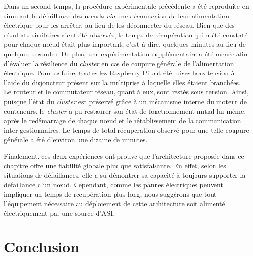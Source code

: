 Dans un second temps, la procédure expérimentale précédente a été reproduite en simulant la défaillance des n\oe{}uds \textit{via} une déconnexion de leur alimentation électrique pour les arrêter, au lieu de les déconnecter du réseau. Bien que des résultats similaires aient été observés, le temps de récupération qui a été constaté pour chaque n\oe{}ud était plus important, c'est-à-dire, quelques minutes au lieu de quelques secondes. De plus, une expérimentation supplémentaire a été menée afin d'évaluer la résilience du \textit{cluster} en cas de coupure générale de l'alimentation électrique. Pour ce faire, toutes les Raspberry Pi ont été mises hors tension à l'aide du disjoncteur présent sur la multiprise à laquelle elles étaient branchées. Le routeur et le commutateur réseau, quant à eux, sont restés sous tension. Ainsi, puisque l'état du \textit{cluster} est préservé grâce à un mécanisme interne du moteur de conteneurs, le \textit{cluster} a pu restaurer son état de fonctionnement initial lui-même, après le redémarrage de chaque n\oe{}ud et le rétablissement de la communication inter-gestionnaires. Le temps de total récupération observé pour une telle coupure générale a été d'environ une dizaine de minutes.

Finalement, ces deux expériences ont prouvé que l'architecture proposée dans ce chapitre offre une fiabilité globale plus que satisfaisante. En effet, selon les situations de défaillances, elle a su démontrer sa capacité à toujours supporter la défaillance d'un n\oe{}ud. Cependant, comme les pannes électriques peuvent impliquer un temps de récupération plus long, nous suggérons que tout l'équipement nécessaire au déploiement de cette architecture soit alimenté électriquement par une source d'\ac{ASI}.

\section{Conclusion}

